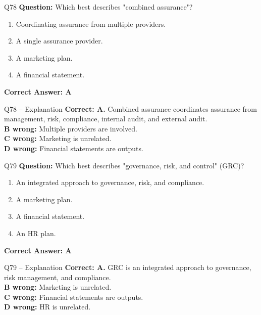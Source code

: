 \documentclass[aspectratio=169,10pt]{beamer}
\begin{document}
	\begin{frame}[t]{Q78}
		\small
		\textbf{Question:} Which best describes "combined assurance"?
		\begin{enumerate}[label=\Alph*.,itemsep=1pt,topsep=2pt]
			\item Coordinating assurance from multiple providers.
			\item A single assurance provider.
			\item A marketing plan.
			\item A financial statement.
		\end{enumerate}
		\vspace{4pt}
		\textbf{Correct Answer: A}
	\end{frame}
	
	\begin{frame}[t]{Q78 -- Explanation}
		\small
		\textbf{Correct: A.} Combined assurance coordinates assurance from management, risk, compliance, internal audit, and external audit. \\[4pt]
		\textbf{B wrong:} Multiple providers are involved. \\[2pt]
		\textbf{C wrong:} Marketing is unrelated. \\[2pt]
		\textbf{D wrong:} Financial statements are outputs.
	\end{frame}
	
	\begin{frame}[t]{Q79}
		\small
		\textbf{Question:} Which best describes "governance, risk, and control" (GRC)?
		\begin{enumerate}[label=\Alph*.,itemsep=1pt,topsep=2pt]
			\item An integrated approach to governance, risk, and compliance.
			\item A marketing plan.
			\item A financial statement.
			\item An HR plan.
		\end{enumerate}
		\vspace{4pt}
		\textbf{Correct Answer: A}
	\end{frame}
	
	\begin{frame}[t]{Q79 -- Explanation}
		\small
		\textbf{Correct: A.} GRC is an integrated approach to governance, risk management, and compliance. \\[4pt]
		\textbf{B wrong:} Marketing is unrelated. \\[2pt]
		\textbf{C wrong:} Financial statements are outputs. \\[2pt]
		\textbf{D wrong:} HR is unrelated.
	\end{frame}
	
\end{document}
